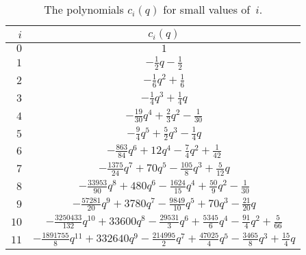 \begin{table}
\small\centering
\renewcommand{\arraystretch}{1.2}
\begin{tabular}{@{\hskip2em}r@{\hskip3pc}c@{\hskip2em}}
$i$ & $c_i(q)$ \\ \toprule
$0$ & $1$ 
		\\ \midrule
$1$ & $-\frac{1}{2} q - \frac{1}{2}$ 
		\\ \midrule
$2$ & $-\frac{1}{6} q^{2} + \frac{1}{6}$ 
		\\ \midrule
$3$ & $-\frac{1}{4} q^{3} + \frac{1}{4} q$ 
		\\ \midrule
$4$ & $-\frac{19}{30} q^{4} + \frac{2}{3} q^{2} - \frac{1}{30}$ 
		\\ \midrule
$5$ & $-\frac{9}{4} q^{5} + \frac{5}{2} q^{3} - \frac{1}{4} q$ 
		\\ \midrule
$6$ & $-\frac{863}{84} q^{6} + 12 q^{4} - \frac{7}{4} q^{2} 
        + \frac{1}{42}$ 
		\\ \midrule
$7$ & $-\frac{1375}{24} q^{7} + 70 q^{5} - \frac{105}{8} q^{3} 
        + \frac{5}{12} q$ 
		\\ \midrule
$8$ & $-\frac{33953}{90} q^{8} + 480 q^{6} - \frac{1624}{15} q^{4} 
        + \frac{50}{9} q^{2} - \frac{1}{30}$ 
		\\ \midrule
$9$ & $-\frac{57281}{20} q^{9} + 3780 q^{7} - \frac{9849}{10} q^{5} 
        + 70 q^{3} - \frac{21}{20} q$ 
		\\ \midrule
$10$ & $-\frac{3250433}{132} q^{10} + 33600 q^{8} - \frac{29531}{3} q^{6} 
        + \frac{5345}{6} q^{4} - \frac{91}{4} q^{2} + \frac{5}{66}$ 
		\\ \midrule
$11$ & $-\frac{1891755}{8} q^{11} + 332640 q^{9} - \frac{214995}{2} q^{7} 
        + \frac{47025}{4} q^{5} - \frac{3465}{8} q^{3} + \frac{15}{4} q$ 
		\\ \bottomrule
\end{tabular}
\caption{The polynomials $c_i(q)$ for small values of~$i$.}
\label{tbl:ciq}
\end{table}

